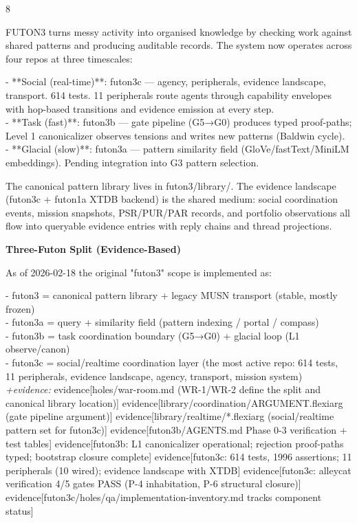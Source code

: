 \documentclass[landscape]{article}
\newcommand{\flexitag}[1]{\textcolor[gray]{0.35}{\textit{#1}}}
\begin{document}
\begin{paracol}{8}
\par
FUTON3 turns messy activity into organised knowledge by checking work against shared patterns and producing auditable records. The system now operates across four repos at three timescales:\\
\par
- **Social (real-time)**: futon3c — agency, peripherals, evidence landscape,\\
  transport. 614 tests. 11 peripherals route agents through capability envelopes with hop-based transitions and evidence emission at every step.\\
- **Task (fast)**: futon3b — gate pipeline (G5→G0) produces typed proof-paths;\\
  Level 1 canonicalizer observes tensions and writes new patterns (Baldwin cycle).\\
- **Glacial (slow)**: futon3a — pattern similarity field (GloVe/fastText/MiniLM\\
  embeddings). Pending integration into G3 pattern selection.\\
\par
The canonical pattern library lives in futon3/library/. The evidence landscape (futon3c + futon1a XTDB backend) is the shared medium: social coordination events, mission snapshots, PSR/PUR/PAR records, and portfolio observations all flow into queryable evidence entries with reply chains and thread projections.\\
\par
\textbf{Three-Futon Split (Evidence-Based)}\par
\par
As of 2026-02-18 the original "futon3" scope is implemented as:\\
\par
- futon3  = canonical pattern library + legacy MUSN transport (stable, mostly frozen)\\
- futon3a = query + similarity field (pattern indexing / portal / compass)\\
- futon3b = task coordination boundary (G5→G0) + glacial loop (L1 observe/canon)\\
- futon3c = social/realtime coordination layer (the most active repo: 614 tests,\\
  11 peripherals, evidence landscape, agency, transport, mission system)\\
  \flexitag{+evidence:} evidence[holes/war-room.md (WR-1/WR-2 define the split and canonical library location)] evidence[library/coordination/ARGUMENT.flexiarg (gate pipeline argument)] evidence[library/realtime/*.flexiarg (social/realtime pattern set for futon3c)] evidence[futon3b/AGENTS.md Phase 0-3 verification + test tables] evidence[futon3b: L1 canonicalizer operational; rejection proof-paths typed; bootstrap closure complete] evidence[futon3c: 614 tests, 1996 assertions; 11 peripherals (10 wired); evidence landscape with XTDB] evidence[futon3c: alleycat verification 4/5 gates PASS (P-4 inhabitation, P-6 structural closure)] evidence[futon3c/holes/qa/implementation-inventory.md tracks component status]\\

\end{paracol}
\end{document}
